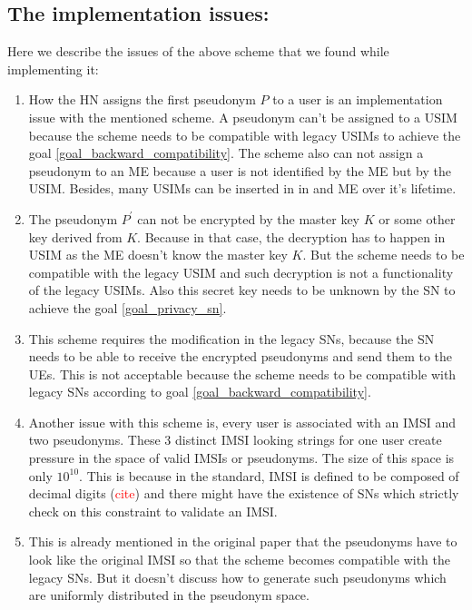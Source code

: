 \documentclass[12pt]{article}
\begin{document}
\subsection*{The implementation issues:} 
Here we describe the issues of the above scheme that we found while implementing it:
\begin{enumerate}
 \item How the HN assigns the first pseudonym $P$ to a user is an implementation issue with the mentioned scheme. A pseudonym can't be assigned to a USIM because the scheme needs to be compatible with legacy USIMs to achieve the goal \ref{goal_backward_compatibility}. The scheme also can not assign a pseudonym to an ME because a user is not identified by the ME but by the USIM. Besides, many USIMs can be inserted in in and ME over it's lifetime.
 
 \item \label{issue_secret_key} The pseudonym $P^{'}$ can not be encrypted by the master key $K$ or some other key derived from $K$. Because in that case, the decryption has to happen in USIM as the ME doesn't know the master key $K$. But the scheme needs to be compatible with the legacy USIM and such decryption is not a functionality of the legacy USIMs. Also this secret key needs to be unknown by the SN to achieve the goal \ref{goal_privacy_sn}.

\item \label{issue_sn_modification} This scheme requires the modification in the legacy SNs, because the SN needs to be able to receive the encrypted pseudonyms and send them to the UEs. This is not acceptable because the scheme needs to be compatible with legacy SNs according to goal \ref{goal_backward_compatibility}.

\item Another issue with this scheme is,  every user is associated with an IMSI and two pseudonyms. These 3 distinct IMSI looking strings for one user create pressure in the space of valid IMSIs or pseudonyms. The size of this space is only $10^{10}$. This is because in the standard, IMSI is defined to be composed of decimal digits (\textcolor{red}{cite}) and there might have the existence of SNs which strictly check on this constraint to validate an IMSI. 

\item \label{issue_imsi_looking_pseudonyms} This is already mentioned in the original paper that the pseudonyms have to look like the original IMSI so that the scheme becomes compatible with the legacy SNs. But it doesn't discuss how to generate such pseudonyms which are uniformly distributed in the pseudonym space.


\end{enumerate}
\end{document}
